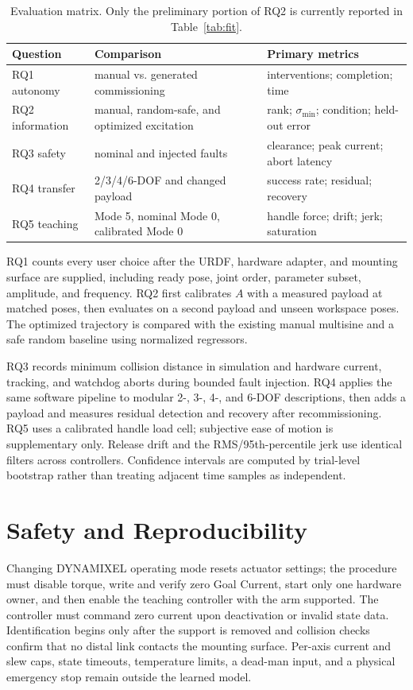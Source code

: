 \documentclass[conference]{IEEEtran}
\begin{document}
\begin{table}[t]
\caption{Evaluation matrix. Only the preliminary portion of RQ2 is currently
reported in Table~\ref{tab:fit}.}
\label{tab:protocol}
\centering
\scriptsize
\begin{tabular}{@{}p{11mm}p{23mm}p{28mm}@{}}
\toprule
Question & Comparison & Primary metrics \\
\midrule
RQ1 autonomy & manual vs. generated commissioning & interventions; completion; time \\
RQ2 information & manual, random-safe, and optimized excitation & rank; $\sigma_{\min}$; condition; held-out error \\
RQ3 safety & nominal and injected faults & clearance; peak current; abort latency \\
RQ4 transfer & 2/3/4/6-DOF and changed payload & success rate; residual; recovery \\
RQ5 teaching & Mode 5, nominal Mode 0, calibrated Mode 0 & handle force; drift; jerk; saturation \\
\bottomrule
\end{tabular}
\end{table}

RQ1 counts every user choice after the URDF, hardware adapter, and mounting
surface are supplied, including ready pose, joint order, parameter subset,
amplitude, and frequency. RQ2 first calibrates $A$ with a measured payload at
matched poses, then evaluates on a second payload and unseen workspace poses.
The optimized trajectory is compared with the existing manual multisine and a
safe random baseline using normalized regressors.

RQ3 records minimum collision distance in simulation and hardware current,
tracking, and watchdog aborts during bounded fault injection. RQ4 applies the
same software pipeline to modular 2-, 3-, 4-, and 6-DOF descriptions, then adds
a payload and measures residual detection and recovery after recommissioning.
RQ5 uses a calibrated handle load cell; subjective ease of motion is
supplementary only. Release drift and the RMS/95th-percentile jerk use identical
filters across controllers. Confidence intervals are computed by trial-level
bootstrap rather than treating adjacent time samples as independent.

\section{Safety and Reproducibility}
Changing DYNAMIXEL operating mode resets actuator settings; the procedure must
disable torque, write and verify zero Goal Current, start only one hardware
owner, and then enable the teaching controller with the arm supported. The
controller must command zero current upon deactivation or invalid state data.
Identification begins only after the support is removed and collision checks
confirm that no distal link contacts the mounting surface. Per-axis current and
slew caps, state timeouts, temperature limits, a dead-man input, and a physical
emergency stop remain outside the learned model.
\end{document}
